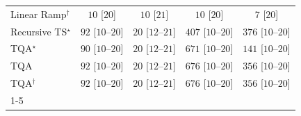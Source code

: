 \begin{tabular}{l|cccc|}
Linear Ramp$^\dagger$ & {\cellcolor[HTML]{F6FCF4}} \color[HTML]{000000} $10$ [$20$] & {\cellcolor[HTML]{F6FCF4}} \color[HTML]{000000} $10$ [$21$] & {\cellcolor[HTML]{F6FCF4}} \color[HTML]{000000} $10$ [$20$] & {\cellcolor[HTML]{F6FCF4}} \color[HTML]{000000} $7$ [$20$] \\
Recursive TS$^\star$ & {\cellcolor[HTML]{E6F5E1}} \color[HTML]{000000} $92$ [$10$--$20$] & {\cellcolor[HTML]{F4FBF1}} \color[HTML]{000000} $20$ [$12$--$21$] & {\cellcolor[HTML]{6BC072}} \color[HTML]{000000} $407$ [$10$--$20$] & {\cellcolor[HTML]{7AC77B}} \color[HTML]{000000} $376$ [$10$--$20$] \\
TQA$^\star$ & {\cellcolor[HTML]{E7F6E2}} \color[HTML]{000000} $90$ [$10$--$20$] & {\cellcolor[HTML]{F4FBF1}} \color[HTML]{000000} $20$ [$12$--$21$] & {\cellcolor[HTML]{026F2E}} \color[HTML]{F1F1F1} $671$ [$10$--$20$] & {\cellcolor[HTML]{D8F0D2}} \color[HTML]{000000} $141$ [$10$--$20$] \\
TQA & {\cellcolor[HTML]{E6F5E1}} \color[HTML]{000000} $92$ [$10$--$20$] & {\cellcolor[HTML]{F4FBF1}} \color[HTML]{000000} $20$ [$12$--$21$] & {\cellcolor[HTML]{016E2D}} \color[HTML]{F1F1F1} $676$ [$10$--$20$] & {\cellcolor[HTML]{83CB82}} \color[HTML]{000000} $356$ [$10$--$20$] \\
TQA$^\dagger$ & {\cellcolor[HTML]{E6F5E1}} \color[HTML]{000000} $92$ [$10$--$20$] & {\cellcolor[HTML]{F4FBF1}} \color[HTML]{000000} $20$ [$12$--$21$] & {\cellcolor[HTML]{016E2D}} \color[HTML]{F1F1F1} $676$ [$10$--$20$] & {\cellcolor[HTML]{83CB82}} \color[HTML]{000000} $356$ [$10$--$20$] \\
\cline{1-5}
\bottomrule
\end{tabular}
